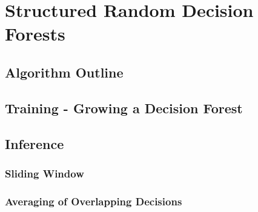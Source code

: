 \chapter{Structured Random Decision Forests}
\label{Chapter3}
\section{Algorithm Outline}
\section{Training - Growing a Decision Forest}
\section{Inference}
\subsection{Sliding Window}
\subsection{Averaging of Overlapping Decisions}
